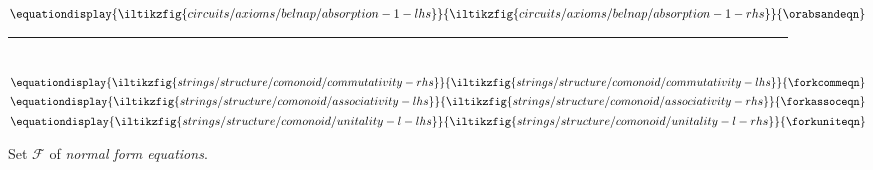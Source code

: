 \begin{figure*}
{    }{\andabsoreqn}\)
    \quad
    \(\equationdisplay{
        \iltikzfig{circuits/axioms/belnap/absorption-1-lhs}
    }{
        \iltikzfig{circuits/axioms/belnap/absorption-1-rhs}
    }{\orabsandeqn}\)
    \\[0.25em]
    \rule{\textwidth}{0.1mm}
    \\[0.5em]
    \(\equationdisplay{
        \iltikzfig{strings/structure/comonoid/commutativity-rhs}
    }{
        \iltikzfig{strings/structure/comonoid/commutativity-lhs}
    }{\forkcommeqn}\)
    \quad
    \(\equationdisplay{
        \iltikzfig{strings/structure/comonoid/associativity-lhs}
    }{
        \iltikzfig{strings/structure/comonoid/associativity-rhs}
    }{\forkassoceqn}\)
    \quad
    \(\equationdisplay{
        \iltikzfig{strings/structure/comonoid/unitality-l-lhs}
    }{
        \iltikzfig{strings/structure/comonoid/unitality-l-rhs}
    }{\forkuniteqn}\)
    \caption{
        Set \(\mathcal{F}\) of \emph{normal form equations}.
    }
    \label{fig:normal-form-equations}
\end{figure*}
